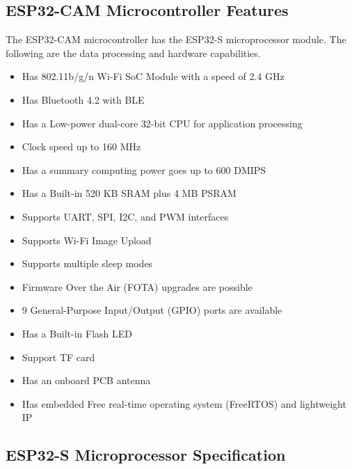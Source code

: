 
\subsection{ESP32-CAM Microcontroller Features}\label{ESP32specifications}

The ESP32-CAM microcontroller has the ESP32-S microprocessor module. The following are the data processing and hardware capabilities.\\
\begin{itemize}
\item Has 802.11b/g/n Wi-Fi SoC Module with a speed of 2.4 GHz
\item Has Bluetooth 4.2 with BLE
\item Has a Low-power dual-core 32-bit CPU for application processing
\item Clock speed up to 160 MHz
\item Has a summary computing power goes up to 600 DMIPS
\item Has a Built-in 520 KB SRAM plus 4 MB PSRAM
\item Supports UART, SPI, I2C, and PWM interfaces
\item Supports Wi-Fi Image Upload
\item Supports multiple sleep modes
\item Firmware Over the Air (FOTA) upgrades are possible
\item 9 General-Purpose Input/Output (GPIO) ports are available
\item Has a Built-in Flash LED
\item Support TF card
\item Has an onboard PCB antenna
\item Has embedded Free real-time operating system (FreeRTOS) and lightweight IP
\end{itemize}

\subsection{ESP32-S Microprocessor Specification}

